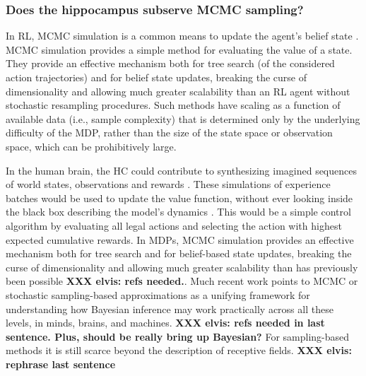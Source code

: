\documentclass[10pt,letterpaper]{article}
\begin{document}
\subsubsection{Does the hippocampus subserve MCMC sampling?}
In RL, MCMC simulation is a common means to update the agent's belief state
\citep{silver2010monte}.
MCMC simulation provides a simple method for evaluating the value of a state.
They provide an effective mechanism both for tree search (of the considered
action trajectories)
and for belief state updates, breaking the curse of dimensionality and allowing much greater scalability than an RL agent without stochastic resampling procedures.
Such methods have scaling as a function of available data (i.e., sample complexity) that
is determined only by the underlying difficulty of the MDP, rather than the size of the state space or observation space,
which can be prohibitively large.

In the human brain,
the HC could contribute to synthesizing imagined sequences of world states,
observations and rewards \citep{aronov2017, chao2017interaction, boyer2008evolutionary}.
These simulations of experience batches
would be used to update the value function, without ever looking inside the black box describing the model's dynamics \citep{lavilleon2015}.
This would be a simple control algorithm by evaluating all legal actions and selecting the action with
highest expected cumulative rewards.
In MDPs, MCMC simulation provides an effective mechanism both for tree search and for belief-based state updates, breaking the curse of dimensionality and allowing much greater scalability than has previously been possible
\textbf{XXX elvis: refs needed.}.
Much recent work points to MCMC or stochastic sampling-based approximations as a unifying framework for understanding how Bayesian inference may work practically across all these levels, in minds, brains, and machines. \textbf{XXX elvis: refs needed in last sentence. Plus, should be really bring up Bayesian?} For sampling-based methods it is still scarce
beyond the description of receptive fields. \textbf{XXX elvis: rephrase last sentence}
\end{document}
